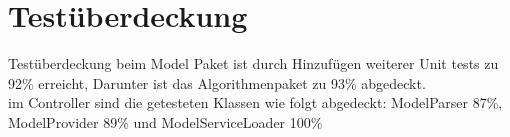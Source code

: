 \section{Testüberdeckung}

Testüberdeckung beim Model Paket ist durch Hinzufügen weiterer Unit tests zu 92\% erreicht, Darunter ist das Algorithmenpaket zu 93\% abgedeckt.\\
im Controller sind die getesteten Klassen wie folgt abgedeckt: ModelParser 87\%, ModelProvider 89\% und ModelServiceLoader 100\%